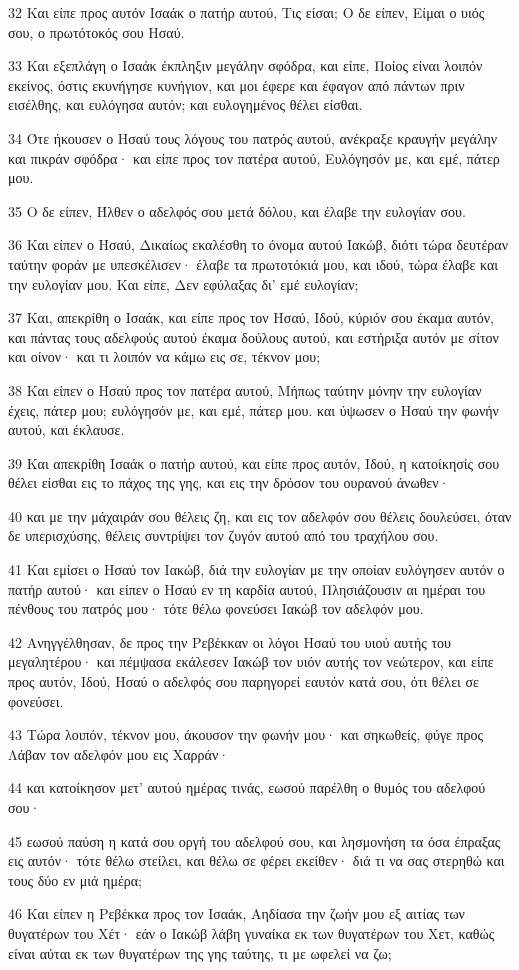 \par 32 Και είπε προς αυτόν Ισαάκ ο πατήρ αυτού, Τις είσαι; Ο δε είπεν, Είμαι ο υιός σου, ο πρωτότοκός σου Ησαύ.
\par 33 Και εξεπλάγη ο Ισαάκ έκπληξιν μεγάλην σφόδρα, και είπε, Ποίος είναι λοιπόν εκείνος, όστις εκυνήγησε κυνήγιον, και μοι έφερε και έφαγον από πάντων πριν εισέλθης, και ευλόγησα αυτόν; και ευλογημένος θέλει είσθαι.
\par 34 Ότε ήκουσεν ο Ησαύ τους λόγους του πατρός αυτού, ανέκραξε κραυγήν μεγάλην και πικράν σφόδρα· και είπε προς τον πατέρα αυτού, Ευλόγησόν με, και εμέ, πάτερ μου.
\par 35 Ο δε είπεν, Ήλθεν ο αδελφός σου μετά δόλου, και έλαβε την ευλογίαν σου.
\par 36 Και είπεν ο Ησαύ, Δικαίως εκαλέσθη το όνομα αυτού Ιακώβ, διότι τώρα δευτέραν ταύτην φοράν με υπεσκέλισεν· έλαβε τα πρωτοτόκιά μου, και ιδού, τώρα έλαβε και την ευλογίαν μου. Και είπε, Δεν εφύλαξας δι' εμέ ευλογίαν;
\par 37 Και, απεκρίθη ο Ισαάκ, και είπε προς τον Ησαύ, Ιδού, κύριόν σου έκαμα αυτόν, και πάντας τους αδελφούς αυτού έκαμα δούλους αυτού, και εστήριξα αυτόν με σίτον και οίνον· και τι λοιπόν να κάμω εις σε, τέκνον μου;
\par 38 Και είπεν ο Ησαύ προς τον πατέρα αυτού, Μήπως ταύτην μόνην την ευλογίαν έχεις, πάτερ μου; ευλόγησόν με, και εμέ, πάτερ μου. και ύψωσεν ο Ησαύ την φωνήν αυτού, και έκλαυσε.
\par 39 Και απεκρίθη Ισαάκ ο πατήρ αυτού, και είπε προς αυτόν, Ιδού, η κατοίκησίς σου θέλει είσθαι εις το πάχος της γης, και εις την δρόσον του ουρανού άνωθεν·
\par 40 και με την μάχαιράν σου θέλεις ζη, και εις τον αδελφόν σου θέλεις δουλεύσει, όταν δε υπερισχύσης, θέλεις συντρίψει τον ζυγόν αυτού από του τραχήλου σου.
\par 41 Και εμίσει ο Ησαύ τον Ιακώβ, διά την ευλογίαν με την οποίαν ευλόγησεν αυτόν ο πατήρ αυτού· και είπεν ο Ησαύ εν τη καρδία αυτού, Πλησιάζουσιν αι ημέραι του πένθους του πατρός μου· τότε θέλω φονεύσει Ιακώβ τον αδελφόν μου.
\par 42 Ανηγγέλθησαν, δε προς την Ρεβέκκαν οι λόγοι Ησαύ του υιού αυτής του μεγαλητέρου· και πέμψασα εκάλεσεν Ιακώβ τον υιόν αυτής τον νεώτερον, και είπε προς αυτόν, Ιδού, Ησαύ ο αδελφός σου παρηγορεί εαυτόν κατά σου, ότι θέλει σε φονεύσει.
\par 43 Τώρα λοιπόν, τέκνον μου, άκουσον την φωνήν μου· και σηκωθείς, φύγε προς Λάβαν τον αδελφόν μου εις Χαρράν·
\par 44 και κατοίκησον μετ' αυτού ημέρας τινάς, εωσού παρέλθη ο θυμός του αδελφού σου·
\par 45 εωσού παύση η κατά σου οργή του αδελφού σου, και λησμονήση τα όσα έπραξας εις αυτόν· τότε θέλω στείλει, και θέλω σε φέρει εκείθεν· διά τι να σας στερηθώ και τους δύο εν μιά ημέρα;
\par 46 Και είπεν η Ρεβέκκα προς τον Ισαάκ, Αηδίασα την ζωήν μου εξ αιτίας των θυγατέρων του Χέτ· εάν ο Ιακώβ λάβη γυναίκα εκ των θυγατέρων του Χετ, καθώς είναι αύται εκ των θυγατέρων της γης ταύτης, τι με ωφελεί να ζω;

